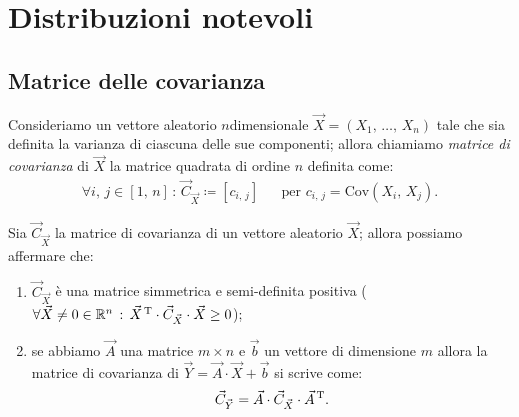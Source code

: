 
\chapter{Distribuzioni notevoli}
    \section{Matrice delle covarianza}\label{defn:Matrice_covarianza}
        \begin{defn}
            Consideriamo un vettore aleatorio $n$\nbdash dimensionale $\vec{X} = (X_1,\, \ldots,\, X_{n})$ tale che sia definita la varianza di ciascuna delle sue componenti; allora chiamiamo \textit{matrice di covarianza} di $\vec{X}$ la matrice quadrata di ordine $n$ definita come:
            \begin{align*}
                \forall i,\,j \in [1,\,n] \,:\, \vec{C}_{\vec{X}} \coloneqq [c_{i,\,j}] & &
                \text{per } c_{i,\,j} = \text{Cov}(X_i,\, X_j)
            .\end{align*}
        \end{defn}
        \begin{prty}
            Sia $\vec{C}_{\vec{X}}$ la matrice di covarianza di un vettore aleatorio $\vec{X}$; allora possiamo affermare che:
            \begin{enumerate}
                \item $\vec{C}_{\vec{X}}$ è una matrice simmetrica e semi-definita positiva 
                    ($\forall \vec{X} \neq 0 \in \mathbb{R}^n \,:\, 
                    \vec{X}^{\text{\,T}}\cdot \vec{C}_{\vec{X}} \cdot \vec{X} \geq 0$);
                \item se abbiamo $\vec{A}$ una matrice $m \times n$ e $\vec{b}$ un vettore di dimensione $m$ allora la matrice di covarianza di $\vec{Y} = \vec{A} \cdot \vec{X} + \vec{b}$ si scrive come: \[
                \vec{C}_{\vec{Y}} = \vec{A} \cdot \vec{C}_{\vec{X}} \cdot \vec{A}^{\text{\,T}}
                .\] 
            \end{enumerate}
        \end{prty}
